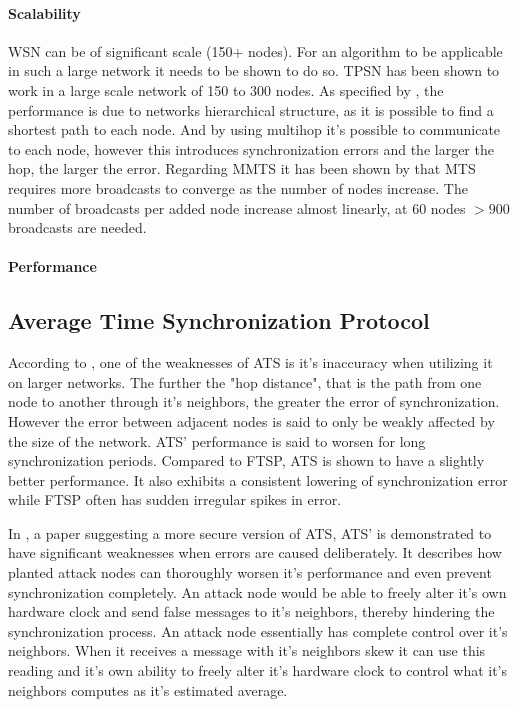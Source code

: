 \documentclass[a4paper,12pt]{article}
\begin{document}
\paragraph{Scalability}

WSN can be of significant scale (150+ nodes). For an algorithm to be applicable in such a large network it needs to be shown to do so. TPSN has been shown to work in a large scale network of 150 to 300 nodes. As specified by \cite{GaneriwalEtAl03}, the performance is due to networks hierarchical structure, as it is possible to find a shortest path to each node. And by using multihop it's possible to communicate to each node, however this introduces synchronization errors and the larger the hop, the larger the error. Regarding MMTS it has been shown by \citet{HeLiChenCheng13} that MTS requires more broadcasts to converge as the number of nodes increase. The number of broadcasts per added node increase almost linearly, at 60 nodes $>900$ broadcasts are needed. 

\paragraph{Performance}

\subsection{Average Time Synchronization Protocol} %
According to \citet{SchenatoFiorentin11}, one of the weaknesses of ATS is it's inaccuracy when utilizing it on larger networks. The further the "hop distance", that is the path from one node to another through it's neighbors, the greater the error of synchronization. However the error between adjacent nodes is said to only be weakly affected by the size of the network. ATS' performance is said to worsen for long synchronization periods. Compared to FTSP, ATS is shown to have a slightly better performance. It also exhibits a consistent lowering of synchronization error while FTSP often has sudden irregular spikes in error.


In \citet{HeChengShiChen13}, a paper suggesting a more secure version of ATS, ATS' is demonstrated to have significant weaknesses when errors are caused deliberately. It describes how planted attack nodes can thoroughly worsen it's performance and even prevent synchronization completely. An attack node would be able to freely alter it's own hardware clock and send false messages to it's neighbors, thereby hindering the synchronization process. An attack node essentially has complete control over it's neighbors. When it receives a message with it's neighbors skew it can use this reading and it's own ability to freely alter it's hardware clock to control what it's neighbors computes as it's estimated average.
\end{document}
